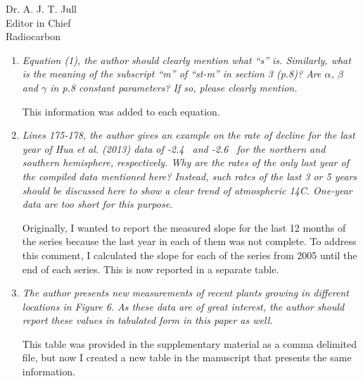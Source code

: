 \documentclass[11pt]{bgcletter}
\begin{document}
\begin{letter}{Dr. A. J. T. Jull \\
 Editor in Chief \\ Radiocarbon}
\begin{enumerate}
{\color{blue} This is an important point, and I am grateful that both reviewers pointed it out. 

In the previous version of the manuscript, I performed all calculations using fraction modern $F$ as described, but now I realized that this would undo the correction to the OX1 standard introduced by the $\Delta^{14}$C notation. For this reason, I changed my calculations to use the \emph{absolute fraction modern} $F'$, which takes $\Delta^{14}$C and expresses it as a fraction through the formula $F' = (\Delta^{14} \text{C} / 1000) +1$. In this way, the fractions are expressed with respect to the value of the standard in 1950 that does not change over time. 

This change had a minor effect on the results. The ets models fitted to the series had no major changes and the forestcasts were modified only by a few years. 
}

\item { \it Equation (1), the author should clearly mention what ``s'' is.
Similarly, what is the meaning of the subscript ``m'' of ``st-m'' in section 3 (p.8)?
Are $\alpha$, $\beta$ and $\gamma$ in p.8 constant parameters? If so, please clearly mention.}

{\color{blue} This information was added to each equation.}

\item {\it Lines 175-178, the author gives an example on the rate of decline for the last year of Hua et al. (2013) data of -2.4 \textperthousand \ and -2.6 \textperthousand \ for the northern and southern hemisphere, respectively.
Why are the rates of the only last year of the compiled data mentioned here? Instead, such rates of the last 3 or 5 years should be discussed here to show a clear trend of atmospheric 14C. One-year data are too short for this purpose. }

{\color{blue} Originally, I wanted to report the measured slope for the last 12 months of the series because the last year in each of them was not complete. To address this comment, I calculated the slope for each of the series from 2005 until the end of each series. This is now reported in a separate table. }

\item {\it The author presents new measurements of recent plants growing in different locations in Figure 6. As these data are of great interest, the author should report these values in tabulated form in this paper as well. }

{\color{blue} This table was provided in the supplementary material as a comma delimited file, but now I created a new table in the manuscript that presents the same information. }


\end{enumerate}
\end{letter}
\end{document}
